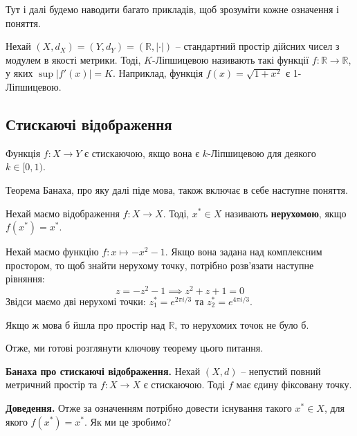 \documentclass[14pt]{extarticle}
\newcommand{\<}{\langle}
\renewcommand{\>}{\rangle}
\theoremstyle{mystyle}{\newtheorem{definition}{Definition}[section]}
\theoremstyle{mystyle}{\newtheorem{proposition}[definition]{Proposition}}
\theoremstyle{mystyle}{\newtheorem{theorem}[definition]{Theorem}}
\theoremstyle{mystyle}{\newtheorem{lemma}[definition]{Lemma}}
\theoremstyle{mystyle}{\newtheorem{corollary}[definition]{Corollary}}
\theoremstyle{mystyle}{\newtheorem*{remark}{Remark}}
\theoremstyle{mystyle}{\newtheorem*{remarks}{Remarks}}
\theoremstyle{mystyle}{\newtheorem*{example}{Example}}
\theoremstyle{mystyle}{\newtheorem*{examples}{Examples}}
\theoremstyle{definition}{\newtheorem*{exercise}{Exercise}}
\theoremstyle{cstyle}{\newtheorem*{cthm}{}}
\theoremstyle{warn}
\begin{document}
Тут і далі будемо наводити багато прикладів, щоб зрозуміти кожне означення і поняття.

\begin{example}
    Нехай $(X,d_X)=(Y,d_Y)=(\mathbb{R},|\cdot|)$ -- стандартний простір дійсних чисел з модулем в якості метрики. Тоді, $K$-Ліпшицевою називають такі функції $f: \mathbb{R} \to \mathbb{R}$, у яких $\sup |f'(x)| = K$. Наприклад, функція $f(x)=\sqrt{1+x^2}$ є 1-Ліпшицевою.
\end{example}

\subsection{Стискаючі відображення}

\begin{definition}
    Функція $f: X \to Y$ є стискаючою, якщо вона є $k$-Ліпшицевою для деякого $k \in [0,1)$.
\end{definition}

Теорема Банаха, про яку далі піде мова, також включає в себе наступне поняття.

\begin{definition}
    Нехай маємо відображення $f: X \to X$. Тоді, $x^* \in X$ називають \textbf{нерухомою}, якщо $f(x^*)=x^*$. 
\end{definition}

\begin{example}
    Нехай маємо функцію $f: x \mapsto -x^2-1$. Якщо вона задана над комплексним простором, то щоб знайти нерухому точку, потрібно розв'язати наступне рівняння:
    \begin{equation}
        z = -z^2 - 1 \implies z^2+z+1 = 0
    \end{equation}
    Звідси маємо дві нерухомі точки: $z_1^*= e^{2\pi i/3}$ та $z_2^*=e^{4\pi i/3}$.

    Якщо ж мова б йшла про простір над $\mathbb{R}$, то нерухомих точок не було б.
\end{example}

Отже, ми готові розглянути ключову теорему цього питання.

\begin{theorem}
    \textbf{Банаха про стискаючі відображення.} Нехай $(X,d)$ -- непустий повний метричний простір та $f: X \to X$ є стискаючою. Тоді $f$ має єдину фіксовану точку.
\end{theorem}

\textbf{Доведення.} Отже за означенням потрібно довести існування такого $x^* \in X$, для якого $f(x^*)=x^*$. Як ми це зробимо?
\end{document}
